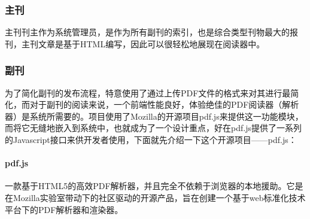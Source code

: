\subsubsection{主刊}
主刊刊主作为系统管理员，是作为所有副刊的索引，也是综合类型刊物最大的报刊，主刊文章是基于HTML编写，因此可以很轻松地展现在阅读器中。

\subsubsection{副刊}
为了简化副刊的发布流程，特意使用了通过上传PDF文件的格式来对其进行最简化，而对于副刊的阅读来说，一个前端性能良好，体验绝佳的PDF阅读器（解析器）是系统所需要的。项目使用了Mozilla的开源项目pdf.js来提供这一功能模块，而将它无缝地嵌入到系统中，也就成为了一个设计重点，好在pdf.js提供了一系列的Javascript接口来供开发者使用，下面就先介绍一下这个开源项目——pdf.js：

\paragraph{pdf.js} 一款基于HTML5的高效PDF解析器，并且完全不依赖于浏览器的本地援助。它是在Mozilla实验室带动下的社区驱动的开源产品，旨在创建一个基于web标准化技术平台下的PDF解析器和渲染器。

\clearpage


